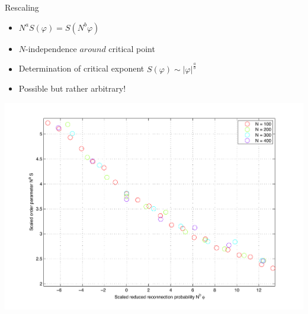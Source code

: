 \documentclass[xcolor=x11names,compress]{beamer}
\renewcommand{\(}{\begin{columns}}
\renewcommand{\)}{\end{columns}}
\newcommand{\<}[1]{\begin{column}{#1}}
\renewcommand{\>}{\end{column}}
\begin{document}
\begin{frame}{Rescaling}

\begin{itemize}
\item $N^{a} S(\varphi) = S(N^b\varphi)$
\item $N$-independence $around$ critical point
\item Determination of critical exponent $S(\varphi) \sim |\varphi|^\frac{a}{b}$
\item Possible but rather arbitrary!
\end{itemize}

\begin{center}
\includegraphics[width=.7\linewidth]{Graphics/SvsPHI2_zoom.pdf}
\end{center}

\end{frame}

\end{document}
